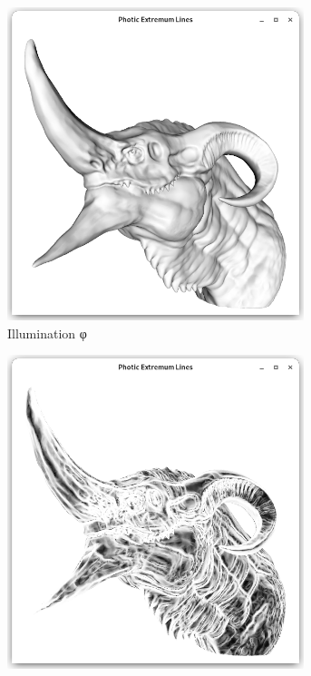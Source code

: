 \documentclass[9pt,fleqn,twoside,twocolumn]{stdglobal}
\begin{document}
  \begin{figure}
    \centering
    \begin{subfigure}[b]{0.24\textwidth}
      \centering
      \includegraphics[width=0.95\textwidth,trim={15px 15 15 50},clip]{images/dragon-head-vertex-lighting.png}
      \caption{Illumination φ}
    \end{subfigure}%
    \hfill%
    \begin{subfigure}[b]{0.24\textwidth}
      \centering
      \includegraphics[width=0.95\textwidth,trim={15px 15 15 50},clip]{images/dragon-head-light-variation.png}

\end{subfigure}
\end{figure}
\end{document}
